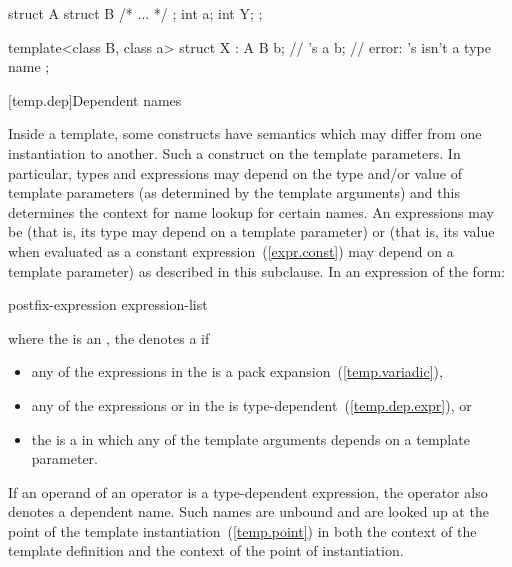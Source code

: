 \begin{codeblock}
struct A {
  struct B { /* ... */ };
  int a;
  int Y;
};

template<class B, class a> struct X : A {
  B b;              // 's 
  a b;              // error: 's  isn't a type name
};
\end{codeblock}
\exitexample

[temp.dep]{Dependent names}

\pnum
{}%
Inside a template, some constructs have semantics which may differ from one
instantiation to another.
Such a construct
on the template parameters.
In particular, types and expressions may depend on the type
and/or
value of
template parameters (as determined by the template arguments) and this determines
the context for name lookup for certain names.
An expressions may be
(that is, its type may depend on a template parameter) or
(that is, its value when evaluated as a constant expression~(\ref{expr.const})
may depend on a template parameter)
as described in this subclause.
In an expression of the form:

\begin{ncbnftab}
postfix-expression \terminal{(} expression-list\opt{} \terminal{)}
\end{ncbnftab}

where the
is an
,
the
denotes a
%
if

\begin{itemize}
\item 
any of the expressions in the  is a pack
expansion~(\ref{temp.variadic}),

\item
any of the expressions
or 
in the
is type-dependent~(\ref{temp.dep.expr}), or

\item
the 
is a  in which any of the template arguments depends
on a template parameter.
\end{itemize}

If an operand of an operator is a type-dependent expression, the operator
also denotes a dependent name.
Such names are unbound and
are looked up at the point of the template instantiation~(\ref{temp.point}) in
both the context of the template definition and the
context of the point of instantiation.

